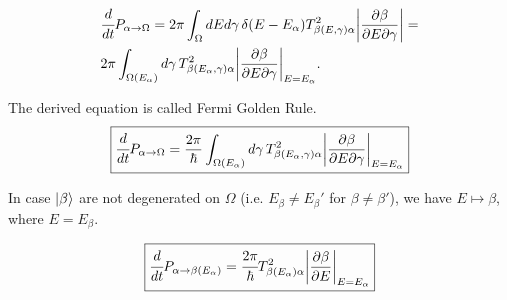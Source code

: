 \documentclass[main.tex]{subfiles}
\begin{document}
\begin{align*}
& \cfrac{d}{dt} P_{\alpha\to{\Omega}} 
= 2\pi \int_\Omega dE d\gamma \, \delta(E - E_\alpha) T_{\beta(E, \gamma)\alpha}^2 \bigg|\frac{\partial \beta}{\partial E \partial \gamma}\bigg| = \\
& 2 \pi \int_{\Omega(E_{\alpha})} d\gamma\,  T_{\beta(E_\alpha, \gamma)\alpha}^2 \bigg| \frac{\partial \beta}{\partial E \partial \gamma}\bigg|_{E = E_\alpha}.
\end{align*}

The derived equation is called Fermi Golden Rule.
\begin{equation}
\boxed{
\cfrac{d}{dt} P_{\alpha\to{\Omega}} 
= \frac{2 \pi}{\hbar} \int_{\Omega(E_{\alpha})} d\gamma\,  T_{\beta(E_\alpha, \gamma)\alpha}^2 \bigg| \frac{\partial \beta}{\partial E \partial \gamma}\bigg|_{E = E_\alpha}
}
\end{equation}  

In case $\ket{\beta}$ are not degenerated on $\Omega$ (i.e. $E_\beta \not= E_\beta'$ for $\beta \not=\beta'$), we have $E \mapsto \beta$, where $E = E_\beta$.

\begin{equation}
\boxed{
\cfrac{d}{dt} P_{\alpha\to\beta(E_\alpha)} 
= \cfrac{2 \pi}{\hbar} T_{\beta(E_\alpha)\alpha}^2 \bigg| \frac{\partial \beta}{\partial E}\bigg|_{E = E_\alpha}
}
\end{equation}  
\end{document}
